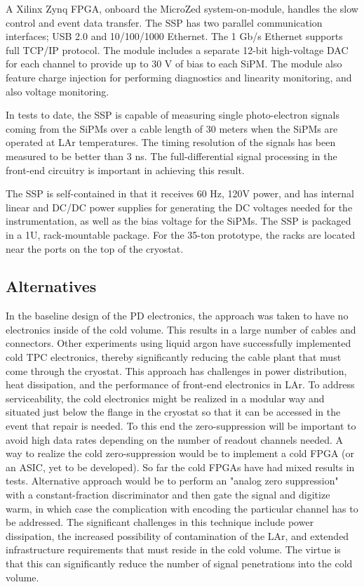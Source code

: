 A Xilinx Zynq FPGA, onboard the MicroZed system-on-module, handles the
slow control and event data transfer.  The SSP has two parallel
communication interfaces; USB 2.0 and 10/100/1000 Ethernet.  The 1
Gb/s Ethernet supports full TCP/IP protocol.  The module includes a
separate 12-bit high-voltage DAC for each channel to provide up to 30
V of bias to each SiPM.  The module also feature charge injection for
performing diagnostics and linearity monitoring, and also voltage
monitoring.

In tests to date, the SSP is capable of measuring single
photo-electron signals coming from the SiPMs over a cable length of 30
meters when the SiPMs are operated at LAr temperatures.  The timing
resolution of the signals has been measured to be better than 3 ns.
The full-differential signal processing in the front-end circuitry is
important in achieving this result.
 
The SSP is self-contained in that it receives 60 Hz, 120V power, and
has internal linear and DC/DC power supplies for generating the DC
voltages needed for the instrumentation, as well as the bias voltage
for the SiPMs.  The SSP is packaged in a 1U, rack-mountable
package. For the 35-ton prototype, the racks are located near the
ports on the top of the cryostat.

\subsection{Alternatives}
\label{sec_alt}

In the baseline design of the PD electronics, the approach was taken
to have no electronics inside of the cold volume.  This results in a
large number of cables and connectors.  Other experiments using liquid
argon have successfully implemented cold TPC electronics, thereby
significantly reducing the cable plant that must come through the
cryostat.  This approach has challenges in power distribution, heat
dissipation, and the performance of front-end electronics in LAr. To
address serviceability, the cold electronics might be realized in a
modular way and situated just below the flange in the cryostat so that
it can be accessed in the event that repair is needed.  To this end
the zero-suppression will be important to avoid high data rates
depending on the number of readout channels needed. A way to realize
the cold zero-suppression would be to implement a cold FPGA (or an
ASIC, yet to be developed).  So far the cold FPGAs have had mixed
results in tests. Alternative approach would be to perform an "analog
zero suppression" with a constant-fraction discriminator and then gate
the signal and digitize warm, in which case the complication with
encoding the particular channel has to be addressed.  The significant
challenges in this technique include power dissipation, the increased
possibility of contamination of the LAr, and extended infrastructure
requirements that must reside in the cold volume.  The virtue is that
this can significantly reduce the number of signal penetrations into
the cold volume.

